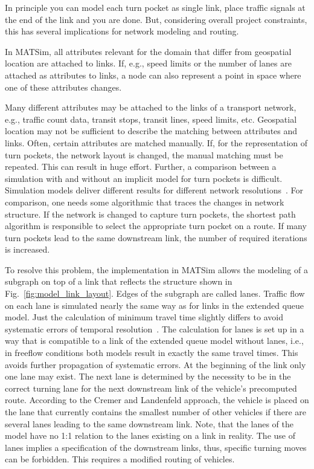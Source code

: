 In principle you can model each turn pocket as single link, place traffic signals at the end of the link and you are done. 
But, considering overall project constraints, this has several implications for network modeling and routing. 

In MATSim, all attributes relevant for the domain that differ from geospatial location are attached to links. 
If, e.g., speed limits or the number of lanes are attached as attributes to links, a node can also represent a point in space where one of these attributes changes.  

Many different attributes may be attached to the links of a transport network, e.g., traffic count data, transit stops, transit lines, speed limits, etc. 
Geospatial location may not be sufficient to describe the matching between attributes and links. 
Often, certain attributes are matched manually. 
If, for the representation of turn pockets, the network layout is changed, the manual matching must be repeated. 
This can result in huge effort. 
Further, a comparison between a simulation with and without an implicit model for turn pockets is difficult. 
Simulation models deliver different results for different network resolutions~\citep[][p.~38]{GawronPhd}.  
For comparison, one needs some algorithmic that traces the changes in network structure.  
If the network is changed to capture turn pockets, the shortest path algorithm is responsible to select the appropriate turn pocket on a route. 
If many turn pockets lead to the same downstream link, the number of required iterations is increased. 

To resolve this problem, the implementation in MATSim allows the modeling of a subgraph on top of a link that reflects the structure shown in Fig.~\ref{fig:model_link_layout}. 
Edges of the subgraph are called \alert{lanes}. 
Traffic flow on each lane is simulated nearly the same way as for links in the extended queue model. 
Just the calculation of minimum travel time slightly differs to avoid systematic errors of temporal resolution~\citep[][p.~38]{GawronPhd}. 
The calculation for lanes is set up in a way that is compatible to a link of the extended queue model without lanes, i.e., in freeflow conditions both models result in exactly the same travel times. 
This avoids further propagation of systematic errors. 
At the beginning of the link only one lane may exist. 
%
The next lane is determined by the necessity to be in the correct turning lane for the next downstream link of the vehicle's precomputed route.
According to the Cremer and Landenfeld approach, the vehicle is placed on the lane that currently contains the smallest number of other vehicles if there are several lanes leading to the same downstream link.
Note, that the lanes of the model have no 1:1 relation to the lanes existing on a link in reality.
The use of lanes implies a specification of the downstream links, thus, specific turning moves can be forbidden. 
This requires a modified routing of vehicles.

